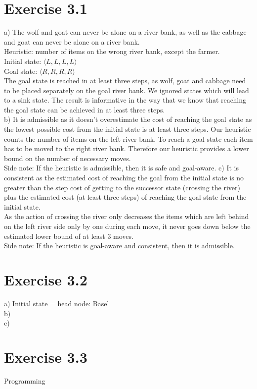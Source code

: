 \documentclass[12pt]{article}
\begin{document}
\section*{Exercise 3.1}
a) The wolf and goat can never be alone on a river bank, as well as the cabbage and goat can never be alone on a river bank.\\ Heuristic: number of items on the wrong river bank, except the farmer.\\
Initial state: $\langle L, L, L, L \rangle$ \\
Goal state: $\langle R, R, R, R \rangle$ \\
The goal state is reached in at least three steps, as wolf, goat and cabbage need to be placed separately on the goal river bank. We ignored states which will lead to a sink state. The result is informative in the way that we know that reaching the goal state can be achieved in at least three steps. \\
b) It is admissible as it doesn't overestimate the cost of reaching the goal state as the lowest possible cost from the initial state is at least three steps. Our heuristic counts the number of items on the left river bank. To reach a goal state each item has to be moved to the right river bank. Therefore our heuristic provides a lower bound on the number of necessary moves. \\Side note: If the heuristic is admissible, then it is safe and goal-aware. \newline
c) It is consistent as the estimated cost of reaching the goal from the initial state is no greater than the step cost of getting to the successor state (crossing the river) plus the estimated cost (at least three steps) of reaching the goal state from the initial state. \\ As the action of crossing the river only decreases the items which are left behind on the left river side only by one during each move, it never goes down below the estimated lower bound of at least 3 moves. \\Side note: If the heuristic is goal-aware and consistent, then it is admissible. \newline



\section*{Exercise 3.2}

a) Initial state = head node: Basel \\
b)   \\
c) \newline


\section*{Exercise 3.3}

Programming
\end{document}
